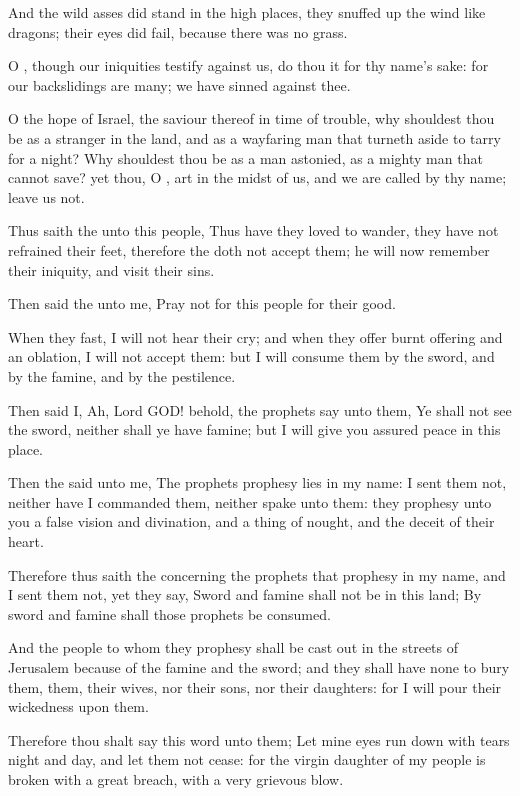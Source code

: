 \verse And the wild asses did stand in the high places, they snuffed up the wind like dragons; their eyes did fail, because there was no grass.

\verse O \LORD, though our iniquities testify against us, do thou it for thy name's sake: for our backslidings are many; we have sinned against thee.

\verse O the hope of Israel, the saviour thereof in time of trouble, why shouldest thou be as a stranger in the land, and as a wayfaring man that turneth aside to tarry for a night?  \verse Why shouldest thou be as a man astonied, as a mighty man that cannot save? yet thou, O \LORD, art in the midst of us, and we are called by thy name; leave us not.

\verse Thus saith the \LORD unto this people, Thus have they loved to wander, they have not refrained their feet, therefore the \LORD doth not accept them; he will now remember their iniquity, and visit their sins.

\verse Then said the \LORD unto me, Pray not for this people for their good.

\verse When they fast, I will not hear their cry; and when they offer burnt offering and an oblation, I will not accept them: but I will consume them by the sword, and by the famine, and by the pestilence.

\verse Then said I, Ah, Lord GOD! behold, the prophets say unto them, Ye shall not see the sword, neither shall ye have famine; but I will give you assured peace in this place.

\verse Then the \LORD said unto me, The prophets prophesy lies in my name: I sent them not, neither have I commanded them, neither spake unto them: they prophesy unto you a false vision and divination, and a thing of nought, and the deceit of their heart.

\verse Therefore thus saith the \LORD concerning the prophets that prophesy in my name, and I sent them not, yet they say, Sword and famine shall not be in this land; By sword and famine shall those prophets be consumed.

\verse And the people to whom they prophesy shall be cast out in the streets of Jerusalem because of the famine and the sword; and they shall have none to bury them, them, their wives, nor their sons, nor their daughters: for I will pour their wickedness upon them.

\verse Therefore thou shalt say this word unto them; Let mine eyes run down with tears night and day, and let them not cease: for the virgin daughter of my people is broken with a great breach, with a very grievous blow.

